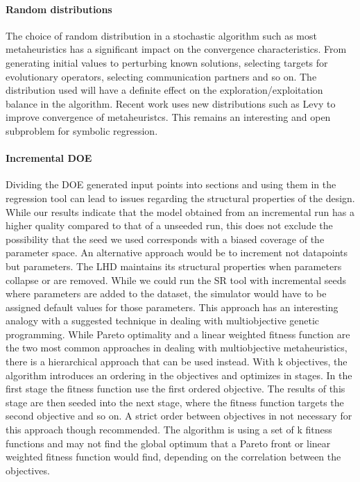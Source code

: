 \paragraph{Random distributions}
The choice of random distribution in a stochastic algorithm such as most metaheuristics has a significant impact on the convergence characteristics. From generating initial values to perturbing known solutions, selecting targets for evolutionary operators, selecting communication partners and so on. The distribution used will have a definite effect on the exploration/exploitation balance in the algorithm. Recent work uses new distributions such as Levy \citep{ABCLevy} to improve convergence of metaheuristcs. This remains an interesting and open subproblem for symbolic regression. 

\paragraph{Incremental DOE}
Dividing the DOE generated input points into sections and using them in the regression tool can lead to issues regarding the structural properties of the design. While our results indicate that the model obtained from an incremental run has a higher quality compared to that  of a unseeded run, this does not exclude the possibility that the seed we used corresponds with a biased coverage of the parameter space. An alternative approach would be to increment not datapoints but parameters. The LHD maintains its structural properties when parameters collapse or are removed. While we could run the SR tool with incremental seeds where parameters are added to the dataset, the simulator would have to be assigned default values for those parameters. This approach has an interesting analogy with a suggested technique in dealing with multiobjective genetic programming. While Pareto optimality and a linear weighted fitness function are the two most common approaches in dealing with multiobjective metaheuristics, there is a hierarchical approach that can be used instead. With k objectives, the algorithm introduces an ordering in the objectives and optimizes in stages. In the first stage the fitness function use the first ordered objective. The results of this stage are then seeded into the next stage, where the fitness function targets the second objective and so on. A strict order between objectives in not necessary for this approach though recommended. The algorithm is using a set of k fitness functions and may not find the global optimum that a Pareto front or linear weighted fitness function would find, depending on the correlation between the objectives.
